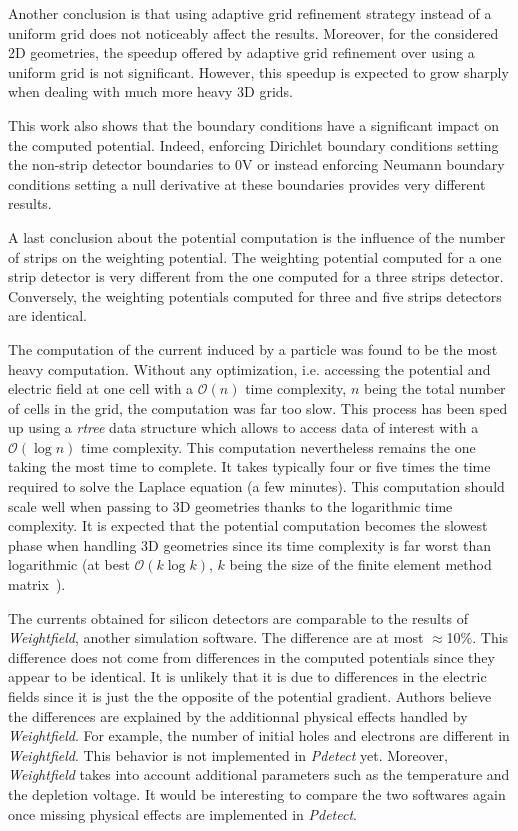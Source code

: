 \documentclass[11pt]{article}
\begin{document}
    Another conclusion is that using adaptive grid refinement strategy instead
	of a uniform grid does not noticeably affect the results. Moreover, for the
	considered 2D geometries, the speedup offered by adaptive grid refinement over
	using a uniform grid is not significant. However, this speedup is expected
	to grow sharply when dealing with much more heavy 3D grids.

	This work also shows that the boundary conditions have a significant impact
	on the computed potential. Indeed, enforcing Dirichlet boundary conditions setting
	the non-strip detector boundaries to 0V or instead enforcing Neumann boundary
	conditions setting a null derivative at these boundaries provides very
	different results.

    A last conclusion about the potential computation is the influence of the
	number of strips on the weighting potential. The weighting potential computed
	for a one strip detector is very different from the one computed for a three
	strips detector. Conversely, the weighting potentials computed for three and five
	strips detectors are identical.

    The computation of the current induced by a particle was found to be the
	most heavy computation. Without any optimization, i.e. accessing the potential
	and electric field at one cell with a $\mathcal{O}(n)$ time complexity, $n$
	being the total number of cells in the grid,
	the computation was far too slow. This process has been sped up using a
	\textit{rtree} data structure which allows to access data of interest
	with a $\mathcal{O}( \log{n})$ time complexity. This computation nevertheless
	remains the one taking the most time to complete. It takes typically four or five
	times the time required to solve the Laplace equation (a few minutes).
	This computation should scale well when passing to 3D geometries thanks
	to the logarithmic time complexity. It is expected that the potential computation
	becomes the slowest phase when handling 3D geometries since its time complexity
	is far worst than logarithmic (at best $\mathcal{O}(k \log{k})$, $k$ being
	the size of the finite element method matrix~\cite{5165661}).

	The currents obtained for silicon
    detectors are comparable to the results of \textit{Weightfield},
    another simulation software. The difference are at most $\approx$10$\%$.
	This difference does not come from differences in the computed potentials
	since they appear to be identical. It is unlikely that it is due to differences
	in the electric fields since it is just the the opposite of the potential
	gradient. Authors believe the differences are explained by the additionnal
	physical effects handled by \textit{Weightfield}. For example, the number
	of initial holes and electrons are different in \textit{Weightfield}. This
	behavior is not implemented in \textit{Pdetect} yet. Moreover, \textit{Weightfield}
	takes into account additional parameters such as the temperature and the
	depletion voltage. It would be interesting to compare the two softwares again once
	 missing physical effects are implemented in \textit{Pdetect}.
\end{document}
